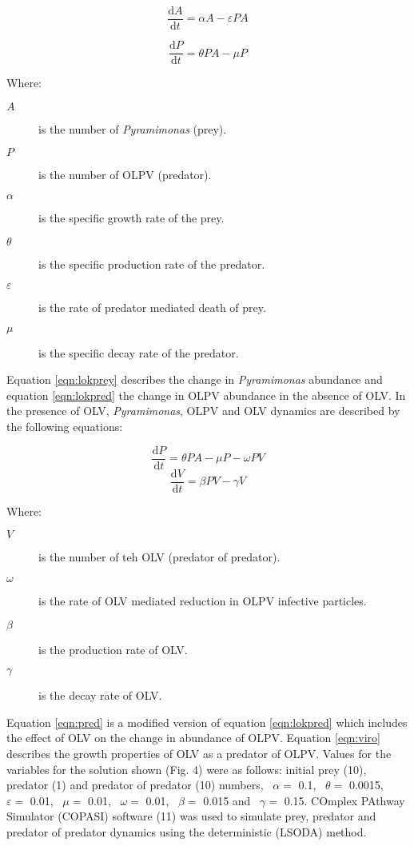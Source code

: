 \begin{equation}
\frac{\mathrm{d}A}{\mathrm{d}t}=\alpha A - \varepsilon PA
\label{eqn:lokprey}
\end{equation}

\begin{equation}
\frac{\mathrm{d}P}{\mathrm{d}t}= \theta PA - \mu P
\label{eqn:lokpred}
\end{equation}

Where:
\begin{description}
\item[$A$] is the number of \emph{Pyramimonas} (prey).
\item[$P$] is the number of OLPV (predator).
\item[$\alpha$] is the specific growth rate of the prey.
\item[$\theta$] is the specific production rate of the predator.
\item[$\varepsilon$] is the rate of predator mediated death of prey.
\item[$\mu$] is the specific decay rate of the predator.
\end{description}

Equation \ref{eqn:lokprey} describes the change in \emph{Pyramimonas} abundance and equation \ref{eqn:lokpred} the change in OLPV abundance in the absence of OLV.
In the presence of OLV, \emph{Pyramimonas}, OLPV and OLV dynamics are described by the following equations:

\begin{equation}
\frac{\mathrm{d}P}{\mathrm{d}t}= \theta PA - \mu P - \omega PV
\label{eqn:pred}
\end{equation}
\begin{equation}
\frac{\mathrm{d}V}{\mathrm{d}t}=\beta PV - \gamma V
\label{eqn:viro}
\end{equation}

Where:
\begin{description}
\item[$V$] is the number of teh OLV (predator of predator).
\item[$\omega$] is the rate of OLV mediated reduction in OLPV infective particles.
\item[$\beta$] is the production rate of OLV.
\item[$\gamma$] is the decay rate of OLV.
\end{description}

Equation \ref{eqn:pred} is a modified version of equation \ref{eqn:lokpred} which includes the effect of OLV on the change in abundance of OLPV.
Equation \ref{eqn:viro} describes the growth properties of OLV as a predator of OLPV.
Values for the variables for the solution shown (Fig. 4) were as follows: initial prey (10), predator (1) and predator of predator (10) numbers, ~$\alpha=$ 0.1, ~$\theta=$ 0.0015, ~$\varepsilon=$ 0.01, ~$\mu=$ 0.01, ~$\omega=$ 0.01, ~$\beta=$ 0.015 and ~$\gamma=$ 0.15. 
COmplex PAthway Simulator (COPASI) software (11) was used to simulate prey, predator and predator of predator dynamics using the deterministic (LSODA) method.


